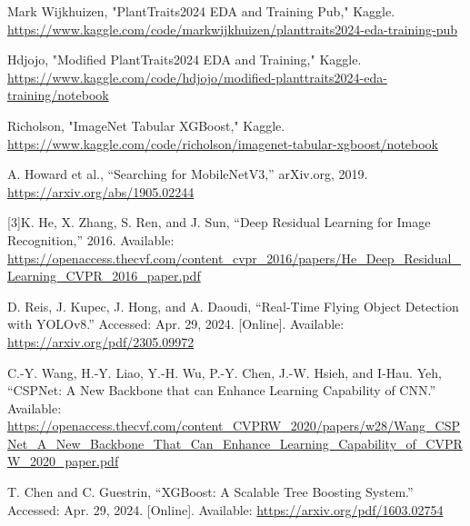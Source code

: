 \documentclass[conference]{IEEEtran}
\begin{document}
\begin{thebibliography}{1}
Mark Wijkhuizen, "PlantTraits2024 EDA and Training Pub," Kaggle. \url{https://www.kaggle.com/code/markwijkhuizen/planttraits2024-eda-training-pub}

Hdjojo, "Modified PlantTraits2024 EDA and  Training," Kaggle. \url{https://www.kaggle.com/code/hdjojo/modified-planttraits2024-eda-training/notebook}

Richolson, "ImageNet Tabular XGBoost," Kaggle. \url{https://www.kaggle.com/code/richolson/imagenet-tabular-xgboost/notebook}

A. Howard et al., “Searching for MobileNetV3,” arXiv.org, 2019. 
\url{https://arxiv.org/abs/1905.02244}

[3]K. He, X. Zhang, S. Ren, and J. Sun, “Deep Residual Learning for Image Recognition,” 2016. Available: \url{https://openaccess.thecvf.com/content_cvpr_2016/papers/He_Deep_Residual_Learning_CVPR_2016_paper.pdf}

D. Reis, J. Kupec, J. Hong, and A. Daoudi, “Real-Time Flying Object Detection with YOLOv8.” Accessed: Apr. 29, 2024. [Online]. Available: \url{https://arxiv.org/pdf/2305.09972}

C.-Y. Wang, H.-Y. Liao, Y.-H. Wu, P.-Y. Chen, J.-W. Hsieh, and I-Hau. Yeh, “CSPNet: A New Backbone that can Enhance Learning Capability of CNN.” Available: \url{https://openaccess.thecvf.com/content_CVPRW_2020/papers/w28/Wang_CSPNet_A_New_Backbone_That_Can_Enhance_Learning_Capability_of_CVPRW_2020_paper.pdf}

T. Chen and C. Guestrin, “XGBoost: A Scalable Tree Boosting System.” Accessed: Apr. 29, 2024. [Online]. Available: \url{https://arxiv.org/pdf/1603.02754}


\end{thebibliography}




\end{document}
